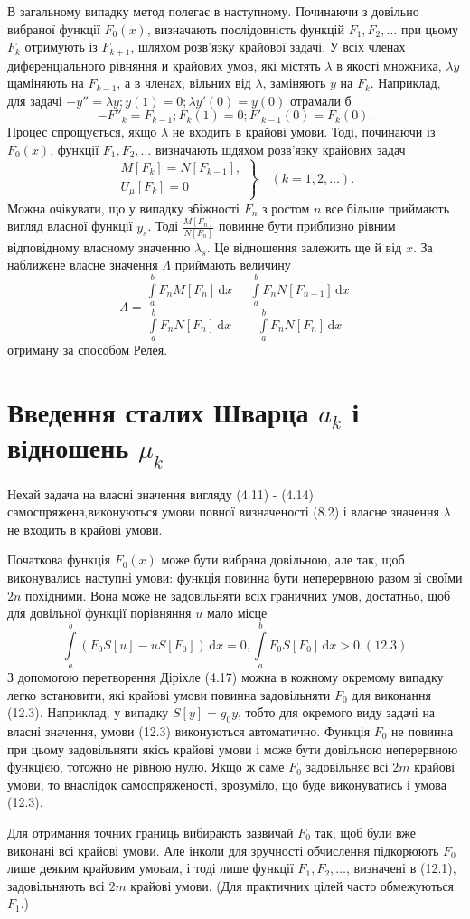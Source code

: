 \documentclass[12pt,a4paper]{article}
\begin{document}
В загальному випадку метод полегає в наступному. Починаючи з довільно вибраної функції $F_0(x)$, визначають послідовність функцій $F_1, F_2, \dots$ при цьому $F_k$ отримують із $F_{k+1}$, шляхом розв'язку крайової задачі. У всіх членах диференціального рівняння и крайових умов, які містять $\lambda$ в якості множника, $\lambda y$ щаміняють на $F_{k-1}$, а в членах, вільних від $\lambda$, заміняють $y$ на $F_k$. Наприклад, для задачі $- y'' = \lambda y; y(1) = 0; \lambda y'(0) = y(0)$ отрамали б
\[
	- F''_k = F_{k-1}; F_k(1) = 0; F'_{k-1}(0) = F_k(0).
\] 
Процес спрощується, якщо $\lambda$ не входить в крайові умови. Тоді, починаючи із $F_0(x)$, функції $F_1, F_2, \dots$ визначають шдяхом розв'язку крайових задач
\[
\left.
\begin{array}{l}
	M[F_k] = N[F_{k-1}],\\
	U_\mu[F_k] = 0
\end{array} \right\}
\quad
(k = 1, 2, \dots).
\]
Можна очікувати, що у випадку збіжності $F_n$ з ростом $n$ все більше приймають вигляд власної функції $y_s$. Тоді $\frac{M[F_n]}{N[F_n]}$ повинне бути приблизно рівним відповідному власному значенню $\lambda_s$. Це відношення залежить ще й від $x$. За наближене власне значення $\Lambda$ приймають величину
\[
\Lambda = \frac{\int\limits_a^b F_n M[F_n]\,\mathrm{d}x}
			   {\int\limits_a^b F_n N[F_n]\,\mathrm{d}x}
		  -
		  \frac{\int\limits_a^b F_n N[F_{n-1}]\,\mathrm{d}x}
			   {\int\limits_a^b F_n N[F_n]\,\mathrm{d}x}
\]
отриману за способом Релея.

\section{Введення сталих Шварца $a_k$ і відношень $\mu_k$}
Нехай задача на власні значення вигляду (4.11) - (4.14) самоспряжена,виконуються умови повної визначеності (8.2) і власне значення $\lambda$ не входить в крайові умови.

Початкова функція $F_0(x)$ може бути вибрана довільною, але так, щоб виконувались наступні умови: функція повинна бути неперервною разом зі своїми $2n$ похідними. Вона може не задовільняти всіх граничних умов, достатньо, щоб для довільної функції порівняння $u$ мало місце
\[
	\int\limits_a^b (F_0 S[u] - u S[F_0])\,\mathrm{d}x = 0, 
	\int\limits_a^b F_0 S[F_0]\,\mathrm{d}x > 0. (12.3)
\]
З допомогою перетворення Діріхле (4.17) можна в кожному окремому випадку легко встановити, які крайові умови повинна задовільняти $F_0$ для виконання (12.3). Наприклад, у випадку $S[y]=g_0 y$, тобто для окремого виду задачі на власні значення, умови (12.3) виконуються автоматично. Функція $F_0$ не повинна при цьому задовільняти якісь крайові умови і може бути довільною неперервною функцією, тотожно не рівною нулю. Якщо ж саме $F_0$ задовільняє всі $2m$ крайові умови, то внаслідок самоспряженості, зрозуміло, що буде виконуватись і умова (12.3).

Для отримання точних границь вибирають зазвичай $F_0$ так, щоб були вже виконані всі крайові умови. Але інколи для зручності обчислення підкорюють $F_0$ лише деяким крайовим умовам, і тоді лише функції $F_1, F_2, \dots$, визначені в (12.1), задовільняють всі $2m$ крайові умови. (Для практичних цілей часто обмежуються $F_1$.)
\end{document}
